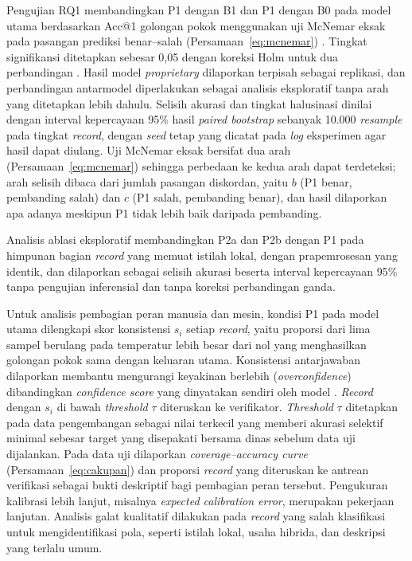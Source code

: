 Pengujian RQ1 membandingkan P1 dengan B1 dan P1 dengan B0 pada model utama berdasarkan Acc@1 golongan pokok menggunakan uji McNemar eksak pada pasangan prediksi benar--salah (Persamaan~\eqref{eq:mcnemar}) \cite{rainio2024evaluation}. Tingkat signifikansi ditetapkan sebesar 0,05 dengan koreksi Holm untuk dua perbandingan \cite{menyhart2021multipletesting}. Hasil model \textit{proprietary} dilaporkan terpisah sebagai replikasi, dan perbandingan antarmodel diperlakukan sebagai analisis eksploratif tanpa arah yang ditetapkan lebih dahulu. Selisih akurasi dan tingkat halusinasi dinilai dengan interval kepercayaan 95\% hasil \textit{paired bootstrap} sebanyak 10.000 \textit{resample} pada tingkat \textit{record}, dengan \textit{seed} tetap yang dicatat pada \textit{log} eksperimen agar hasil dapat diulang. Uji McNemar eksak bersifat dua arah (Persamaan~\eqref{eq:mcnemar}) sehingga perbedaan ke kedua arah dapat terdeteksi; arah selisih dibaca dari jumlah pasangan diskordan, yaitu $b$ (P1 benar, pembanding salah) dan $c$ (P1 salah, pembanding benar), dan hasil dilaporkan apa adanya meskipun P1 tidak lebih baik daripada pembanding.

Analisis ablasi eksploratif membandingkan P2a dan P2b dengan P1 pada himpunan bagian \textit{record} yang memuat istilah lokal, dengan prapemrosesan yang identik, dan dilaporkan sebagai selisih akurasi beserta interval kepercayaan 95\% tanpa pengujian inferensial dan tanpa koreksi perbandingan ganda.

Untuk analisis pembagian peran manusia dan mesin, kondisi P1 pada model utama dilengkapi skor konsistensi $s_i$ setiap \textit{record}, yaitu proporsi dari lima sampel berulang pada temperatur lebih besar dari nol yang menghasilkan golongan pokok sama dengan keluaran utama. Konsistensi antarjawaban dilaporkan membantu mengurangi keyakinan berlebih (\textit{overconfidence}) dibandingkan \textit{confidence score} yang dinyatakan sendiri oleh model \cite{xiong2024calibration}. \textit{Record} dengan $s_i$ di bawah \textit{threshold} $\tau$ diteruskan ke verifikator. \textit{Threshold} $\tau$ ditetapkan pada data pengembangan sebagai nilai terkecil yang memberi akurasi selektif minimal sebesar target yang disepakati bersama dinas sebelum data uji dijalankan. Pada data uji dilaporkan \textit{coverage--accuracy curve} (Persamaan~\eqref{eq:cakupan}) dan proporsi \textit{record} yang diteruskan ke antrean verifikasi sebagai bukti deskriptif bagi pembagian peran tersebut. Pengukuran kalibrasi lebih lanjut, misalnya \textit{expected calibration error}, merupakan pekerjaan lanjutan. Analisis galat kualitatif dilakukan pada \textit{record} yang salah klasifikasi untuk mengidentifikasi pola, seperti istilah lokal, usaha hibrida, dan deskripsi yang terlalu umum.

